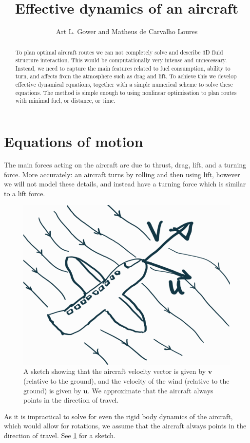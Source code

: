 \documentclass{article}
\title{Effective dynamics of an aircraft}
\author{Art L. Gower and Matheus de Carvalho Loures}
\renewcommand{\vec}[1]{\boldsymbol{#1}}
\begin{document}
\maketitle

\begin{abstract}
    To plan optimal aircraft routes we can not completely solve and describe 3D fluid structure interaction. This would be computationally very intense and unnecessary. Instead, we need to capture the main features related to fuel consumption, ability to turn, and affects from the atmosphere such as drag and lift. To achieve this we develop effective dynamical equations, together with a simple numerical scheme to solve these equations. The method is simple enough to using nonlinear optimisation to plan routes with minimal fuel, or distance, or time.  
\end{abstract}

\section{Equations of motion}
The main forces acting on the aircraft are due to thrust, drag, lift, and a turning force. More accurately: an aircraft turns by rolling and then using lift, however we will not model these details, and instead have a turning force which is similar to a lift force.

\begin{figure}[ht]
    \centering
    \includegraphics[width = 0.4\linewidth]{"plane-sketch.png"}
    \caption{A sketch showing that the aircraft velocity vector is given by $\vec v$ (relative to the ground), and the velocity of the wind (relative to the ground) is given by $\vec u$. We approximate that the aircraft always points in the direction of travel.}
    \label{fig:plane-sketch}
\end{figure}

As it is impractical to solve for even the rigid body dynamics of the aircraft, which would allow for rotations, we assume that the aircraft always points in the direction of travel. See \cref{fig:plane-sketch} for a sketch. 
\end{document}
